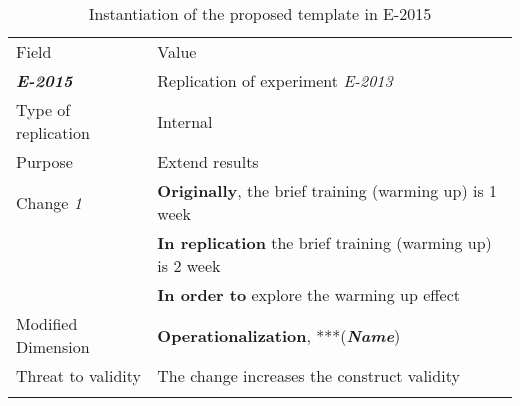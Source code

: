 \begin{table*}[h]
  \caption{Instantiation of the proposed template in E-2015}
\label{tab:plantEng}
  \centering

\begin{tabularx}{\textwidth}{
  >{\hsize=0.3\hsize}X
  >{\hsize=0.8\hsize}X}
  
    \noalign{\smallskip}\hline\noalign{\smallskip}
  
  Field &  Value  \\ 
  \noalign{\smallskip}\hline\noalign{\smallskip}
  
\textbf {\textit{E-2015}} &  Replication of experiment \textit{E-2013}    \\
Type of replication &  Internal   \\  
Purpose  &  Extend results \\   \hline
    
    Change \textit{1}   & \textbf{Originally}, the brief training (warming up) is 1 week \\& \textbf{In replication} the brief training (warming up) is 2 week \\& \textbf{In order to} explore the warming up effect \\
    
   Modified Dimension & 
   \textbf{Operationalization}, ***(\textbf{\textit{Name}}) \\ 
    Threat to validity & The change increases the construct validity \\ 
   \noalign{\smallskip\smallskip}\hline
    
	\end{tabularx}  
	
\end{table*}